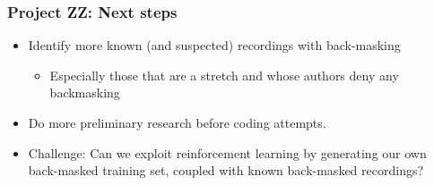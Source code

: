 
\begin{frame}
    \frametitle{\textcolor{Mahogany}{Project ZZ: Next steps}}

    \begin{itemize}
    	\item Identify more known (and suspected) recordings with back-masking
    	\begin{itemize}
    		\item Especially those that are a stretch and whose authors deny any backmasking
        \end{itemize}
        \item Do more preliminary research before coding attempts.
        \item Challenge: Can we exploit reinforcement learning by generating our own back-masked training set, coupled with known back-masked recordings?
    \end{itemize}
\end{frame}